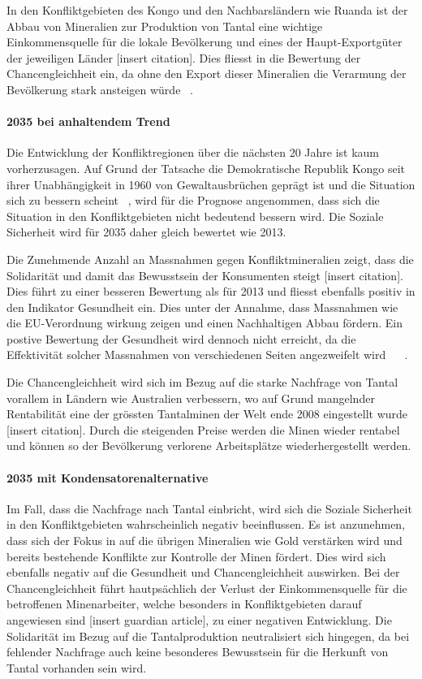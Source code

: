 In den Konfliktgebieten des Kongo und den Nachbarsländern wie Ruanda ist der Abbau von 
Mineralien zur Produktion von Tantal eine wichtige Einkommensquelle für die lokale Bevölkerung
und eines der Haupt-Exportgüter der jeweiligen Länder [insert citation]. Dies fliesst in
die Bewertung der Chancengleichheit ein, da ohne den Export dieser Mineralien die Verarmung
der Bevölkerung stark ansteigen würde ~\cite{DRCongo35}.

\paragraph{2035 bei anhaltendem Trend} Die Entwicklung der Konfliktregionen über die nächsten 20 Jahre
ist kaum vorherzusagen. Auf Grund der Tatsache die Demokratische Republik Kongo seit ihrer Unabhängigkeit
in 1960 von Gewaltausbrüchen geprägt ist und die Situation sich zu bessern scheint ~\cite{Demokrat2}, wird für die 
Prognose angenommen, dass sich die Situation in den Konfliktgebieten nicht bedeutend bessern wird.
Die Soziale Sicherheit wird für 2035 daher gleich bewertet wie 2013. 

Die Zunehmende Anzahl an Massnahmen gegen Konfliktmineralien zeigt, dass die Solidarität und damit das Bewusstsein
der Konsumenten steigt [insert citation]. Dies führt zu einer besseren Bewertung als für 2013 und fliesst ebenfalls
positiv in den Indikator Gesundheit ein. Dies unter der Annahme, dass Massnahmen wie die EU-Verordnung wirkung zeigen und
einen Nachhaltigen Abbau fördern. Ein postive Bewertung der Gesundheit wird dennoch nicht erreicht, da die Effektivität
solcher Massnahmen von verschiedenen Seiten angezweifelt wird ~\cite{Demokrat2} ~\cite{TheEUCon25}. 

Die Chancengleichheit wird sich im Bezug auf die starke Nachfrage von Tantal vorallem in Ländern wie
Australien verbessern, wo auf Grund mangelnder Rentabilität eine der grössten Tantalminen der Welt ende 2008 
eingestellt wurde [insert citation]. Durch die steigenden Preise werden die Minen wieder rentabel und 
können so der Bevölkerung verlorene Arbeitsplätze wiederhergestellt werden.  

\paragraph{2035 mit Kondensatorenalternative} Im Fall, dass die Nachfrage nach Tantal einbricht, wird sich die
Soziale Sicherheit in den Konfliktgebieten wahrscheinlich negativ beeinflussen. Es ist anzunehmen, dass sich der
Fokus in auf die übrigen Mineralien wie Gold verstärken wird und bereits bestehende Konflikte zur Kontrolle der 
Minen fördert. Dies wird sich ebenfalls negativ auf die Gesundheit und Chancengleichheit auswirken. Bei der 
Chancengleichheit führt hautpsächlich der Verlust der Einkommensquelle für die betroffenen Minenarbeiter, welche
besonders in Konfliktgebieten darauf angewiesen sind [insert guardian article], zu einer negativen Entwicklung. 
Die Solidarität im Bezug auf die Tantalproduktion neutralisiert sich hingegen, da bei fehlender Nachfrage auch 
keine besonderes Bewusstsein für die Herkunft von Tantal vorhanden sein wird.  

